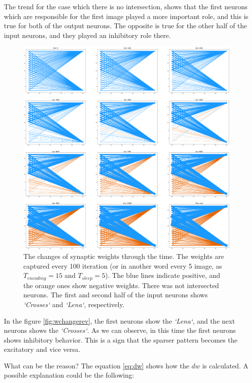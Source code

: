 \documentclass{article}
\begin{document}
	The trend for the case which there is no intersection, shows that the first neurons which are responsible for the first image played a more important role, and this is true for both of the output neurons. The opposite is true for the other half of the input neurons, and they played an inhibitory role there.
	
	\begin{figure}
		\includegraphics[width=\textwidth]{weight_change.png}
		\caption{The changes of synaptic weights through the time. The weights are captured every 100 iteration (or in another word every 5 image, as $T_{encoding}=15$ and $T_{sleep}=5$). The blue lines indicate positive, and the orange ones show negative weights. There was not intersected neurons. The first and second half of the input neurons shows \textit{`Crosses`} and \textit{`Lena`}, respectively.}
		\label{fig:wchange}
	\end{figure}
	
	In the figure \ref{fig:wchangerev}, the first neurons show the \textit{`Lena`}, and the next neurons shows the \textit{`Crosses`}. As we can observe, in this time the first neurons shows inhibitory behavior. This is a sign that the sparser pattern becomes the excitatory and vice versa.

	What can be the reason? The equation \ref{eq:dw} shows how the $dw$ is calculated. A possible explanation could be the following:
	
\end{document}

